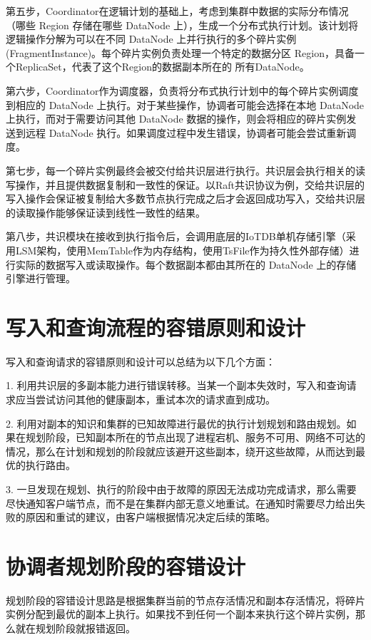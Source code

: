 第五步，Coordinator在逻辑计划的基础上，考虑到集群中数据的实际分布情况（哪些 Region 存储在哪些 DataNode 上），生成一个分布式执行计划。该计划将逻辑操作分解为可以在不同 DataNode 上并行执行的多个碎片实例 (FragmentInstance)。每个碎片实例负责处理一个特定的数据分区 Region，具备一个ReplicaSet，代表了这个Region的数据副本所在的 所有DataNode。

第六步，Coordinator作为调度器，负责将分布式执行计划中的每个碎片实例调度到相应的 DataNode 上执行。对于某些操作，协调者可能会选择在本地 DataNode 上执行，而对于需要访问其他 DataNode 数据的操作，则会将相应的碎片实例发送到远程 DataNode 执行。如果调度过程中发生错误，协调者可能会尝试重新调度。

第七步，每一个碎片实例最终会被交付给共识层进行执行。共识层会执行相关的读写操作，并且提供数据复制和一致性的保证。以Raft共识协议为例，交给共识层的写入操作会保证被复制给大多数节点执行完成之后才会返回成功写入，交给共识层的读取操作能够保证读到线性一致性的结果。

第八步，共识模块在接收到执行指令后，会调用底层的IoTDB单机存储引擎（采用LSM架构，使用MemTable作为内存结构，使用TsFile\cite{zhao2024apachetsfile}作为持久性外部存储）进行实际的数据写入或读取操作。每个数据副本都由其所在的 DataNode 上的存储引擎进行管理。


\section{写入和查询流程的容错原则和设计}

写入和查询请求的容错原则和设计可以总结为以下几个方面：

1. 利用共识层的多副本能力进行错误转移。当某一个副本失效时，写入和查询请求应当尝试访问其他的健康副本，重试本次的请求直到成功。

2. 利用对副本的知识和集群的已知故障进行最优的执行计划规划和路由规划。如果在规划阶段，已知副本所在的节点出现了进程宕机、服务不可用、网络不可达的情况，那么在计划和规划的阶段就应该避开这些副本，绕开这些故障，从而达到最优的执行路由。

3. 一旦发现在规划、执行的阶段中由于故障的原因无法成功完成请求，那么需要尽快通知客户端节点，而不是在集群内部无意义地重试。在通知时需要尽力给出失败的原因和重试的建议，由客户端根据情况决定后续的策略。


\section{协调者规划阶段的容错设计}

规划阶段的容错设计思路是根据集群当前的节点存活情况和副本存活情况，将碎片实例分配到最优的副本上执行。如果找不到任何一个副本来执行这个碎片实例，那么就在规划阶段就报错返回。

